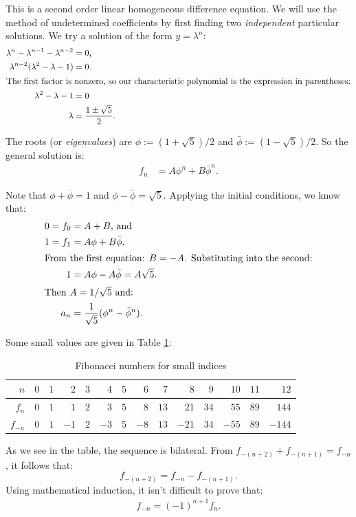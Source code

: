 \documentclass[12pt,letterpaper]{report}
\numberwithin{equation}{chapter}
\begin{document}
This is a second order linear homogeneous difference equation.  We will use the method of undetermined
coefficients by first finding two \emph{independent} particular solutions.  We try a solution of the
form $y=\lambda^n$:
\begin{align}
	\lambda^n - \lambda^{n-1} - \lambda^{n-2} &= 0 \text{,} \\
	\lambda^{n-2} (\lambda^2 - \lambda - 1) &= 0 \text{.} \\
\intertext{The first factor is nonzero, so our characteristic polynomial is the expression in parentheses:}
	\lambda^2 - \lambda - 1 &= 0 \\
	\lambda &= \frac{1\pm\sqrt{5}}{2} \text{.}
\end{align}

The roots (or \emph{eigenvalues}) are $\phi:=(1+\sqrt{5})/2$ and $\bar{\phi}:=(1-\sqrt{5})/2$.  So the
general solution is:
\begin{align}
	f_n &= A\phi^n + B\bar{\phi}^n\text{.}
\end{align}

Note that $\phi+\bar{\phi}=1$ and $\phi-\bar{\phi}=\sqrt{5}$.  Applying the initial conditions, we know
that:
\begin{align}
	0 = f_0 &= A + B\text{, and} \\
	1 = f_1 &= A\phi + B\bar{\phi}\text{.} \\
	\intertext{From the first equation: $B=-A$.  Substituting into the second:}
	1 &= A\phi - A\bar{\phi} = A\sqrt{5}\text{.} \\
\intertext{Then $A = 1/\sqrt{5}$ and:}
	a_n &= \frac{1}{\sqrt{5}}(\phi^n - \bar{\phi}^n)\text{.}
\end{align}

Some small values are given in Table \ref{tbl:fib}:
\begin{table}[ht]
	\begin{center}
	\begin{tabular}{r|rrrrrrrrrrrrr}
	$n$      & $0$ & $1$ &  $2$ & $3$ & $4$  & $5$ &  $6$ &  $7$ &   $8$ &  $9$ &  $10$
			 & $11$ &  $12$ \\
	\hline
	$f_n$    & $0$ & $1$ &  $1$ & $2$ & $3$  & $5$ &  $8$ & $13$ &  $21$ & $34$ &  $55$
			 & $89$ &  $144$ \\ 
	$f_{-n}$ & $0$ & $1$ & $-1$ & $2$ & $-3$ & $5$ & $-8$ & $13$ & $-21$ & $34$ & $-55$
			 & $89$ & $-144$ \\ 
	\end{tabular}
	\end{center}
	\caption{Fibonacci numbers for small indices}
	\label{tbl:fib}
\end{table}

As we see in the table, the sequence is bilateral.  From $f_{-(n+2)}+f_{-(n+1)}=f_{-n}$, it follows that:
\[
	f_{-(n+2)} = f_{-n} - f_{-(n+1)}\text{.}
\]
Using mathematical induction, it isn't difficult to prove that:
\begin{align}
	f_{-n} = (-1)^{n+1} f_n \text{.}
\end{align}
\end{document}
